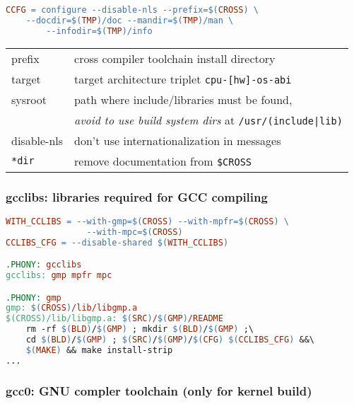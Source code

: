 
\begin{lstlisting}[language=make,title=mk/cfg.mk]
CCFG = configure --disable-nls --prefix=$(CROSS) \
	--docdir=$(TMP)/doc --mandir=$(TMP)/man \
		--infodir=$(TMP)/info
\end{lstlisting}

\begin{tabular}{l l}
prefix & cross compiler toolchain install directory\\
target & target architecture triplet \verb|cpu-[hw]-os-abi| \\
sysroot & path where include/libraries must be found,\\
& \emph{avoid to use build system dirs} at \verb$/usr/(include|lib)$\\
\hline
disable-nls & don't use internationalization in messages \\
\verb$*dir$ & remove documentation from \verb|$CROSS|\\
\end{tabular}

\clearpage
\subsubsection{gcclibs: libraries required for GCC compiling}


\begin{lstlisting}[language=make,title=mk/cross]
WITH_CCLIBS = --with-gmp=$(CROSS) --with-mpfr=$(CROSS) \
				--with-mpc=$(CROSS)  
CCLIBS_CFG = --disable-shared $(WITH_CCLIBS)

.PHONY: gcclibs
gcclibs: gmp mpfr mpc

.PHONY: gmp
gmp: $(CROSS)/lib/libgmp.a
$(CROSS)/lib/libgmp.a: $(SRC)/$(GMP)/README
	rm -rf $(BLD)/$(GMP) ; mkdir $(BLD)/$(GMP) ;\
	cd $(BLD)/$(GMP) ; $(SRC)/$(GMP)/$(CFG) $(CCLIBS_CFG) &&\
	$(MAKE) && make install-strip
...	
\end{lstlisting}

\clearpage
\subsubsection{gcc0: GNU compler toolchain (only for kernel build)}

